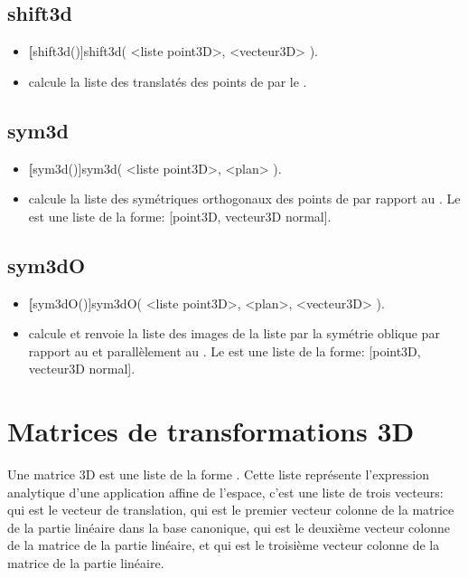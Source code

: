 \subsection{shift3d}
\begin{itemize}
 \item \util \textbf[shift3d()]{shift3d( <liste point3D>, <vecteur3D> )}.
 \item \desc calcule la liste des translatés des points de  par le .
\end{itemize}

\subsection{sym3d}
\begin{itemize}
 \item \util \textbf[sym3d()]{sym3d( <liste point3D>, <plan> )}.
 \item \desc calcule la liste des symétriques orthogonaux des points de  par rapport au . Le  est une liste de la forme: [point3D, vecteur3D normal].
\end{itemize}

\subsection{sym3dO}
\begin{itemize}
 \item \util \textbf[sym3dO()]{sym3dO( <liste point3D>, <plan>, <vecteur3D> )}.
 \item \desc calcule et renvoie la liste des images de la liste par la symétrie oblique par rapport au  et parallèlement au . Le  est une liste de la forme: [point3D, vecteur3D normal].
\end{itemize}

\section{Matrices de transformations 3D} 

Une matrice 3D est une liste de la forme . Cette liste représente l'expression analytique d'une application affine de l'espace, c'est une liste de trois vecteurs:  qui est le vecteur de translation,  qui est le premier vecteur colonne de la matrice de la partie linéaire dans la base canonique,  qui est le deuxième vecteur colonne de la matrice de la partie linéaire, et  qui est le troisième vecteur colonne de la matrice de la partie linéaire. 

